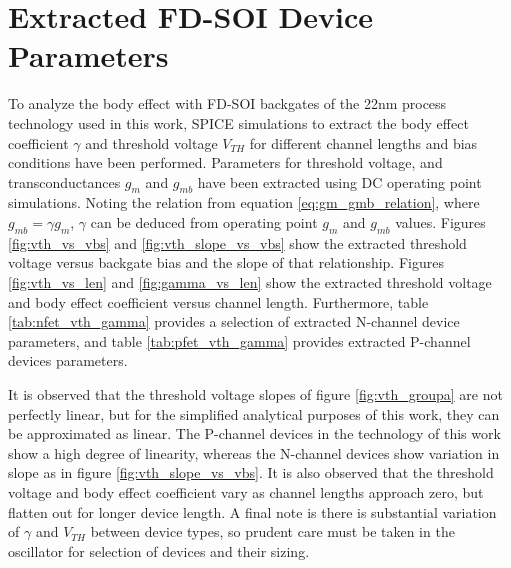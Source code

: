 \section{Extracted FD-SOI Device Parameters}\label{sec:fet_extracted_data}
		To analyze the body effect with FD-SOI backgates of the 22nm process technology used in this work, SPICE simulations to extract the body effect coefficient $\gamma$ and threshold voltage $V_{TH}$ for different channel lengths and bias conditions have been performed. Parameters for threshold voltage, and transconductances $g_m$ and $g_{mb}$ have been extracted using DC operating point simulations. Noting the relation from equation \ref{eq:gm_gmb_relation}, where $g_{mb} = \gamma g_{m}$, $\gamma$ can be deduced from operating point $g_m$ and $g_{mb}$ values. Figures \ref{fig:vth_vs_vbs} and \ref{fig:vth_slope_vs_vbs} show the extracted threshold voltage versus backgate bias and the slope of that relationship. Figures \ref{fig:vth_vs_len} and \ref{fig:gamma_vs_len} show the extracted threshold voltage and body effect coefficient versus channel length. Furthermore, table \ref{tab:nfet_vth_gamma} provides a selection of extracted N-channel device parameters, and table \ref{tab:pfet_vth_gamma} provides extracted P-channel devices parameters.

		It is observed that the threshold voltage slopes of figure \ref{fig:vth_groupa} are not perfectly linear, but for the simplified analytical purposes of this work, they can be approximated as linear. The P-channel devices in the technology of this work show a high degree of linearity, whereas the N-channel devices show variation in slope as in figure \ref{fig:vth_slope_vs_vbs}. It is also observed that the threshold voltage and body effect coefficient vary as channel lengths approach zero, but flatten out for longer device length. A final note is there is substantial variation of $\gamma$ and $V_{TH}$ between device types, so prudent care must be taken in the oscillator for selection of devices and their sizing.


